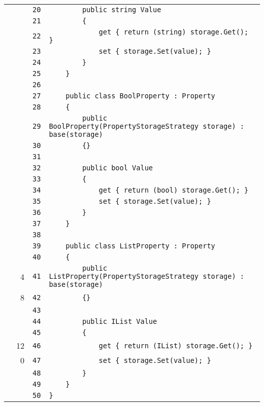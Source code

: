 \documentclass[a4paper,10pt]{article}
\begin{document}
\begin{longtable}[l]{lrrl}
\cellcolor{gray} &  & \verb~20~ & \verb~        public string Value~\\
\cellcolor{gray} &  & \verb~21~ & \verb~        {~\\
\cellcolor{gray} &  & \verb~22~ & \verb~            get { return (string) storage.Get(); }~\\
\cellcolor{gray} &  & \verb~23~ & \verb~            set { storage.Set(value); }~\\
\cellcolor{gray} &  & \verb~24~ & \verb~        }~\\
\cellcolor{gray} &  & \verb~25~ & \verb~    }~\\
\cellcolor{gray} &  & \verb~26~ & \verb~~\\
\cellcolor{gray} &  & \verb~27~ & \verb~    public class BoolProperty : Property~\\
\cellcolor{gray} &  & \verb~28~ & \verb~    {~\\
\cellcolor{gray} &  & \verb~29~ & \verb~        public BoolProperty(PropertyStorageStrategy storage) : base(storage)~\\
\cellcolor{gray} &  & \verb~30~ & \verb~        {}~\\
\cellcolor{gray} &  & \verb~31~ & \verb~~\\
\cellcolor{gray} &  & \verb~32~ & \verb~        public bool Value~\\
\cellcolor{gray} &  & \verb~33~ & \verb~        {~\\
\cellcolor{gray} &  & \verb~34~ & \verb~            get { return (bool) storage.Get(); }~\\
\cellcolor{gray} &  & \verb~35~ & \verb~            set { storage.Set(value); }~\\
\cellcolor{gray} &  & \verb~36~ & \verb~        }~\\
\cellcolor{gray} &  & \verb~37~ & \verb~    }~\\
\cellcolor{gray} &  & \verb~38~ & \verb~~\\
\cellcolor{gray} &  & \verb~39~ & \verb~    public class ListProperty : Property~\\
\cellcolor{gray} &  & \verb~40~ & \verb~    {~\\
\cellcolor{green} & 4 & \verb~41~ & \verb~        public ListProperty(PropertyStorageStrategy storage) : base(storage)~\\
\cellcolor{green} & 8 & \verb~42~ & \verb~        {}~\\
\cellcolor{gray} &  & \verb~43~ & \verb~~\\
\cellcolor{gray} &  & \verb~44~ & \verb~        public IList Value~\\
\cellcolor{gray} &  & \verb~45~ & \verb~        {~\\
\cellcolor{green} & 12 & \verb~46~ & \verb~            get { return (IList) storage.Get(); }~\\
\cellcolor{red} & 0 & \verb~47~ & \verb~            set { storage.Set(value); }~\\
\cellcolor{gray} &  & \verb~48~ & \verb~        }~\\
\cellcolor{gray} &  & \verb~49~ & \verb~    }~\\
\cellcolor{gray} &  & \verb~50~ & \verb~}~\\
\end{longtable}
\newpage
\end{document}
